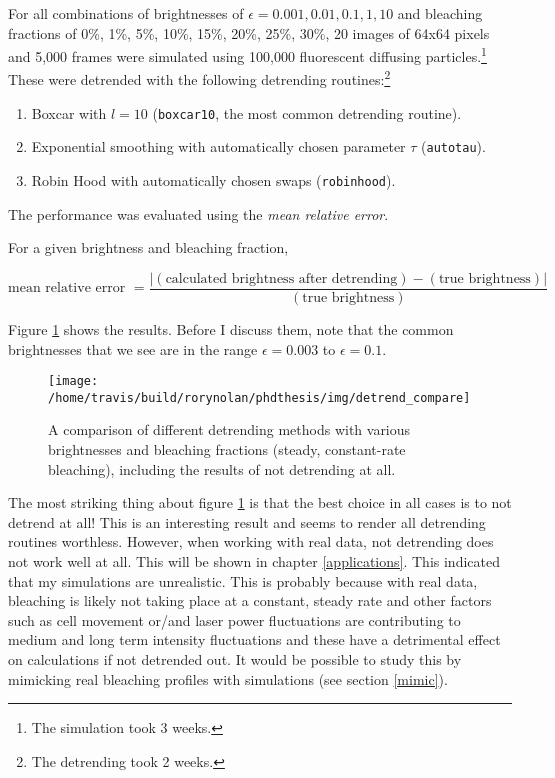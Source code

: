 \documentclass[12pt,]{book}
\providecommand{\tightlist}{%
  \setlength{\itemsep}{0pt}\setlength{\parskip}{0pt}}
\let\rmarkdownfootnote\footnote%
\def\footnote{\protect\rmarkdownfootnote}
\theoremstyle{definition}
\theoremstyle{definition}
\theoremstyle{definition}
\theoremstyle{remark}
\let\BeginKnitrBlock\begin \let\EndKnitrBlock\end
\begin{document}
For all combinations of brightnesses of
\(\epsilon = 0.001, 0.01, 0.1, 1, 10\) and bleaching fractions of 0\%,
1\%, 5\%, 10\%, 15\%, 20\%, 25\%, 30\%, 20 images of 64x64 pixels and
5,000 frames were simulated using 100,000 fluorescent diffusing
particles.\footnote{The simulation took 3 weeks.} These were detrended
with the following detrending routines:\footnote{The detrending took 2
  weeks.}

\begin{enumerate}
\def\labelenumi{\arabic{enumi}.}
\tightlist
\item
  Boxcar with \(l = 10\) (\texttt{boxcar10}, the most common detrending
  routine).
\item
  Exponential smoothing with automatically chosen parameter \(\tau\)
  (\texttt{autotau}).
\item
  Robin Hood with automatically chosen swaps (\texttt{robinhood}).
\end{enumerate}

The performance was evaluated using the \emph{mean relative error}.

\BeginKnitrBlock{definition}
\protect\hypertarget{def:unnamed-chunk-35}{}{\label{def:unnamed-chunk-35} }
For a given brightness and bleaching fraction,

\begin{equation}
\text{mean relative error } = \frac{|(\text{calculated brightness after detrending}) - (\text{true brightness})|}{(\text{true brightness})}
\label{eq:mean-relative-error}
\end{equation}
\EndKnitrBlock{definition}

Figure \ref{fig:detrend-compare} shows the results. Before I discuss
them, note that the common brightnesses that we see are in the range
\(\epsilon = 0.003\) to \(\epsilon = 0.1\).






\begin{figure}

\texttt{[image: /home/travis/build/rorynolan/phdthesis/img/detrend\_compare]} \hfill{}

\caption{A comparison of different detrending
methods with various brightnesses and bleaching fractions (steady,
constant-rate bleaching), including the results of not detrending at
all.}\label{fig:detrend-compare}
\end{figure}

The most striking thing about figure \ref{fig:detrend-compare} is that
the best choice in all cases is to not detrend at all! This is an
interesting result and seems to render all detrending routines
worthless. However, when working with real data, not detrending does not
work well at all. This will be shown in chapter \ref{applications}. This
indicated that my simulations are unrealistic. This is probably because
with real data, bleaching is likely not taking place at a constant,
steady rate and other factors such as cell movement or/and laser power
fluctuations are contributing to medium and long term intensity
fluctuations and these have a detrimental effect on calculations if not
detrended out. It would be possible to study this by mimicking real
bleaching profiles with simulations (see section \ref{mimic}).
\end{document}
